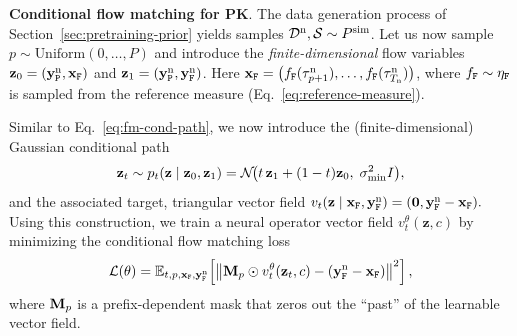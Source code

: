 
\textbf{Conditional flow matching for PK}.
%
The data generation process of Section~\ref{sec:pretraining-prior} yields samples $\mathcal{D}^{\rm n}, \mathcal{S} \sim P^{\mathrm{sim}}$. 
%
Let us now sample $p \sim \text{Uniform}(0, \dots, P)$ and introduce the \textit{finite-dimensional} flow variables 
%
$\mathbf{z}_0 = (\mathbf{y}_{\tt P}^{\rm n}, \mathbf{x}_{\tt F})$ and $\mathbf{z}_1 = (\mathbf{y}_{\tt P}^{\rm n}, \mathbf{y}^{\rm n}_{\tt F})$. 
%
Here $\mathbf{x}_{\tt F} = \left(f_{\tt F}(\tau_{p+1}^{\rm n}), \dots, f_{\tt F}(\tau_{T_{\rm n}}^{\rm n}) \right)$, where $f_{\tt F} \sim \eta_{\tt F}$ is sampled from the reference measure (Eq.~\ref{eq:reference-measure}).

Similar to Eq.~\ref{eq:fm-cond-path}, we now introduce the (finite-dimensional) Gaussian conditional path 
\begin{equation}
{\bf z}_t \sim p_t({\bf z} \mid {\bf z}_0, {\bf z}_1) =\mathcal{N}\!\bigl(t \, {\bf z}_1+(1-t){\bf z}_0,\;\sigma_{\min}^2 I\bigr),
\end{equation}
and the associated target, triangular vector field
$
v_t({\bf z} \mid {\bf x}_{\tt F},{\bf y}_{\tt F}^{\rm n}) = (\mathbf{0}, \mathbf{y}_{\tt F}^{\rm n}- \mathbf{x}_{\tt F}).
$
Using this construction, we train a neural operator vector field
$v^\theta_t(\mathbf{z}, c)$ by minimizing the conditional flow matching loss
\begin{equation*}
\mathcal{L}(\theta)
=
\mathbb{E}_{t,p,\mathbf{x}_{\tt F},\mathbf{y}^{\rm n}_{\tt F}}
\!\left[
\left\|
{\bf M}_p \odot v^\theta_t(\mathbf{z}_t, c)
-
 (\mathbf{y}^{\rm n}_{\tt F}-\mathbf{x}_{\tt F})
\right\|^2
\right],
\end{equation*}
where ${\bf M}_p$ is a prefix-dependent mask that zeros out the ``past'' of the learnable vector field.


